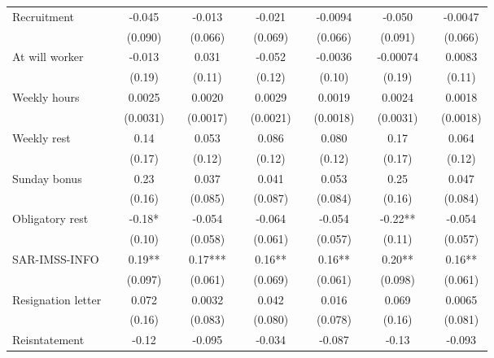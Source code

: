 \begin{tabular}{lcccccccccccc}
Recruitment &       & -0.045 &       & -0.013 &       & -0.021 &       & -0.0094 &       & -0.050 &       & -0.0047 \\
      &       & (0.090) &       & (0.066) &       & (0.069) &       & (0.066) &       & (0.091) &       & (0.066) \\
At will worker &       & -0.013 &       & 0.031 &       & -0.052 &       & -0.0036 &       & -0.00074 &       & 0.0083 \\
      &       & (0.19) &       & (0.11) &       & (0.12) &       & (0.10) &       & (0.19) &       & (0.11) \\
Weekly hours &       & 0.0025 &       & 0.0020 &       & 0.0029 &       & 0.0019 &       & 0.0024 &       & 0.0018 \\
      &       & (0.0031) &       & (0.0017) &       & (0.0021) &       & (0.0018) &       & (0.0031) &       & (0.0018) \\
Weekly rest &       & 0.14  &       & 0.053 &       & 0.086 &       & 0.080 &       & 0.17  &       & 0.064 \\
      &       & (0.17) &       & (0.12) &       & (0.12) &       & (0.12) &       & (0.17) &       & (0.12) \\
Sunday bonus &       & 0.23  &       & 0.037 &       & 0.041 &       & 0.053 &       & 0.25  &       & 0.047 \\
      &       & (0.16) &       & (0.085) &       & (0.087) &       & (0.084) &       & (0.16) &       & (0.084) \\
Obligatory rest &       & -0.18* &       & -0.054 &       & -0.064 &       & -0.054 &       & -0.22** &       & -0.054 \\
      &       & (0.10) &       & (0.058) &       & (0.061) &       & (0.057) &       & (0.11) &       & (0.057) \\
SAR-IMSS-INFO &       & 0.19** &       & 0.17*** &       & 0.16** &       & 0.16** &       & 0.20** &       & 0.16** \\
      &       & (0.097) &       & (0.061) &       & (0.069) &       & (0.061) &       & (0.098) &       & (0.061) \\
Resignation letter &       & 0.072 &       & 0.0032 &       & 0.042 &       & 0.016 &       & 0.069 &       & 0.0065 \\
      &       & (0.16) &       & (0.083) &       & (0.080) &       & (0.078) &       & (0.16) &       & (0.081) \\
Reisntatement &       & -0.12 &       & -0.095 &       & -0.034 &       & -0.087 &       & -0.13 &       & -0.093 \\

\end{tabular}
